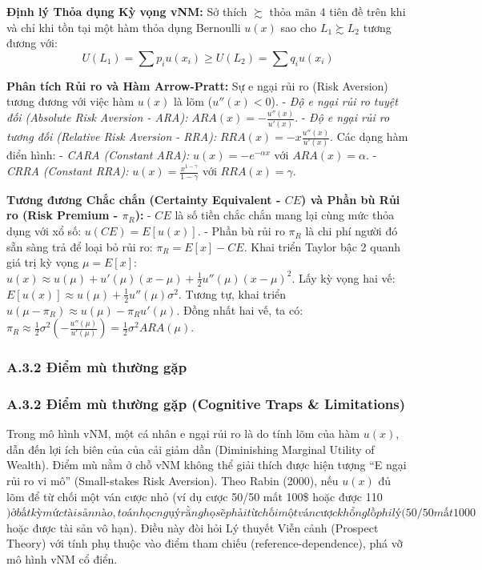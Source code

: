 \documentclass[
]{article}
\begin{document}
\textbf{Định lý Thỏa dụng Kỳ vọng vNM:} Sở thích \(\succsim\) thỏa mãn 4
tiên đề trên khi và chỉ khi tồn tại một hàm thỏa dụng Bernoulli \(u(x)\)
sao cho \(L_1 \succsim L_2\) tương đương với:
\[ U(L_1) = \sum p_i u(x_i) \geq U(L_2) = \sum q_i u(x_i) \]

\textbf{Phân tích Rủi ro và Hàm Arrow-Pratt:} Sự e ngại rủi ro (Risk
Aversion) tương đương với việc hàm \(u(x)\) là lõm (\(u''(x) < 0\)). -
\emph{Độ e ngại rủi ro tuyệt đối (Absolute Risk Aversion - ARA):}
\(ARA(x) = - \frac{u''(x)}{u'(x)}\). - \emph{Độ e ngại rủi ro tương đối
(Relative Risk Aversion - RRA):} \(RRA(x) = - x \frac{u''(x)}{u'(x)}\).
Các dạng hàm điển hình: - \emph{CARA (Constant ARA):}
\(u(x) = -e^{-\alpha x}\) với \(ARA(x) = \alpha\). - \emph{CRRA
(Constant RRA):} \(u(x) = \frac{x^{1-\gamma}}{1-\gamma}\) với
\(RRA(x) = \gamma\).

\textbf{Tương đương Chắc chắn (Certainty Equivalent - \(CE\)) và Phần bù
Rủi ro (Risk Premium - \(\pi_R\)):} - \(CE\) là số tiền chắc chắn mang
lại cùng mức thỏa dụng với xổ số: \(u(CE) = E[u(x)]\). - Phần bù rủi ro
\(\pi_R\) là chi phí người đó sẵn sàng trả để loại bỏ rủi ro:
\(\pi_R = E[x] - CE\). Khai triển Taylor bậc 2 quanh giá trị kỳ vọng
\(\mu = E[x]\):
\(u(x) \approx u(\mu) + u'(\mu)(x - \mu) + \frac{1}{2}u''(\mu)(x - \mu)^2\).
Lấy kỳ vọng hai vế:
\(E[u(x)] \approx u(\mu) + \frac{1}{2}u''(\mu) \sigma^2\). Tương tự,
khai triển \(u(\mu - \pi_R) \approx u(\mu) - \pi_R u'(\mu)\). Đồng nhất
hai vế, ta có:
\(\pi_R \approx \frac{1}{2} \sigma^2 \left( - \frac{u''(\mu)}{u'(\mu)} \right) = \frac{1}{2} \sigma^2 ARA(\mu)\).

\subsubsection{A.3.2 Điểm mù thường
gặp}\label{a.3.2-ux111iux1ec3m-muxf9-thux1b0ux1eddng-gux1eb7p}

\subsubsection{A.3.2 Điểm mù thường gặp (Cognitive Traps \&
Limitations)}\label{a.3.2-ux111iux1ec3m-muxf9-thux1b0ux1eddng-gux1eb7p-cognitive-traps-limitations}

Trong mô hình vNM, một cá nhân e ngại rủi ro là do tính lõm của hàm
\(u(x)\), dẫn đến lợi ích biên của của cải giảm dần (Diminishing
Marginal Utility of Wealth). Điểm mù nằm ở chỗ vNM không thể giải thích
được hiện tượng ``E ngại rủi ro vi mô'' (Small-stakes Risk Aversion).
Theo Rabin (2000), nếu \(u(x)\) đủ lõm để từ chối một ván cược nhỏ (ví
dụ cược 50/50 mất 100\$ hoặc được
110\() ở bất kỳ mức tài sản nào, toán học ngụ ý rằng họ sẽ phải từ chối một ván cược khổng lồ phi lý (50/50 mất 1000\)
hoặc được tài sản vô hạn). Điều này đòi hỏi Lý thuyết Viễn cảnh
(Prospect Theory) với tính phụ thuộc vào điểm tham chiếu
(reference-dependence), phá vỡ mô hình vNM cổ điển.
\end{document}
